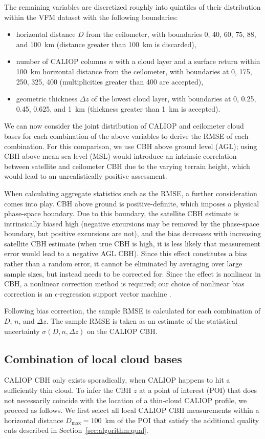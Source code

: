 \documentclass[essd,manuscript]{copernicus}\usepackage[]{graphicx}\usepackage[]{color}
\newcommand{\hlnum}[1]{\textcolor[rgb]{0.686,0.059,0.569}{#1}}%
\newcommand\comment[2]{\{\hlnum{ \textit{#1}: #2}\}}
\newcommand\commentjm[1]{\comment{$j_\mu$}{#1}}
\begin{document}
The remaining variables are discretized roughly into quintiles of their
distribution within the VFM dataset with the
following boundaries:
\begin{itemize}
\item horizontal distance $D$ from the ceilometer, with boundaries 0, 40, 60,
  75, 88, and 100~km (distance greater than 100~km is discarded),
\item number of CALIOP columns $n$ with a cloud layer and a surface return
  within 100~km horizontal distance from the ceilometer, with boundaries at 0,
  175, 250, 325, 400 (multiplicities greater than 400 are accepted),
\item geometric thickness $\Delta z$ of the lowest cloud layer, with boundaries
  at 0, 0.25, 0.45, 0.625, and 1~km (thickness greater than 1~km is accepted).
\end{itemize}

We can now consider the joint distribution of CALIOP and ceilometer cloud bases
for each combination of the above variables to derive the RMSE of each
combination.  For this comparison, we use CBH above ground level (AGL); using
CBH above mean sea level (MSL) would introduce an intrinsic correlation between
satellite and ceilometer CBH due to the varying terrain height, which would lead
to an unrealistically positive assessment.

When calculating aggregate statistics such as the RMSE, a further consideration
comes into play.  CBH above ground is positive-definite, which imposes a
physical phase-space boundary.  Due to this boundary, the satellite CBH estimate
is intrinsically biased high (negative excursions may be removed by the
phase-space boundary, but positive excursions are not), and the bias decreases
with increasing satellite CBH estimate (when true CBH is high, it is less likely
that measurement error would lead to a negative AGL CBH).  Since this effect
constitutes a bias rather than a random error, it cannot be eliminated by
averaging over large sample sizes, but instead needs to be corrected for.  Since
the effect is nonlinear in CBH, a nonlinear correction method is required; our
choice of nonlinear bias correction is an $\epsilon$-regression support vector
machine \citep[SVM,][]{svm}.

Following bias correction, the sample RMSE is calculated for each combination of
$D$, $n$, and $\Delta z$.  The sample RMSE is taken as an estimate of the
statistical uncertainty $\sigma(D,n,\Delta z)$ on the CALIOP CBH.

\subsection{Combination of local cloud bases}
\label{sec:algorithm:combination}
CALIOP CBH only exists sporadically, %
when CALIOP happens to hit a sufficiently thin cloud.  To infer the CBH $z$ at a
point of interest (POI) that does not necessarily coincide with the location of
a thin-cloud CALIOP profile, we proceed as follows.  We first select all local
CALIOP CBH measurements within a horizontal distance $D_\text{max} = 100$~km of
the POI that satisfy the additional quality cuts described in
Section~\ref{sec:algorithm:qual}. 
\end{document}
